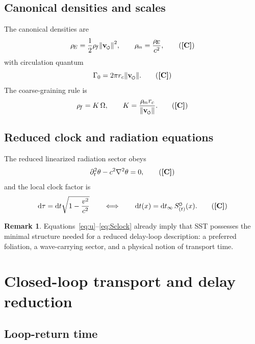 \documentclass[11pt]{article}
\newcommand{\swirlarrow}{\mathchoice{\mkern-2mu\scriptstyle\boldsymbol{\circlearrowleft}}{\mkern-2mu\scriptstyle\boldsymbol{\circlearrowleft}}{\mkern-2mu\scriptscriptstyle\boldsymbol{\circlearrowleft}}{\mkern-2mu\scriptscriptstyle\boldsymbol{\circlearrowleft}}}
\newcommand{\vswirl}{\mathbf{v}_{\swirlarrow}}
\newcommand{\SwirlClock}{S_{(t)}^{\swirlarrow}}
\newcommand{\rhoF}{\rho_{\!f}}\newcommand{\rhof}{\rho_{\!f}}     %
\newcommand{\rhoE}{\rho_{\!E}}\newcommand{\rhoe}{\rho_{\!E}}                           %
\newcommand{\rhoM}{\rho_{\!m}}\newcommand{\rhom}{\rho_{\!m}}                           %
\newcommand{\rc}{r_c}           %
\newcommand{\TagC}{\textbf{[C]}} %
\theoremstyle{definition}
\newtheorem{remark}[definition]{Remark}
\theoremstyle{plain}
\begin{document}
\subsection{Canonical densities and scales}

The canonical densities are
\begin{equation}
\rhoE=\frac12 \rhoF \norm{\vswirl}^2,
\qquad
\rhoM=\frac{\rhoE}{c^2},
\tag{\TagC}
\label{eq:rho}
\end{equation}
with circulation quantum
\begin{equation}
\Gamma_0=2\pi \rc \norm{\vswirl}.
\tag{\TagC}
\label{eq:Gamma0}
\end{equation}
The coarse-graining rule is
\begin{equation}
\rhoF = K\,\Omega,
\qquad
K=\frac{\rhoM \rc}{\norm{\vswirl}}.
\tag{\TagC}
\label{eq:K}
\end{equation}

\subsection{Reduced clock and radiation equations}

The reduced linearized radiation sector obeys
\begin{equation}
\partial_t^2\theta-c^2\nabla^2\theta=0,
\tag{\TagC}
\label{eq:theta}
\end{equation}
and the local clock factor is
\begin{equation}
\dd \tau = \dd t \sqrt{1-\frac{v^2}{c^2}}
\qquad\Longleftrightarrow\qquad
\dd t(x)=\dd t_\infty\,\SwirlClock(x).
\tag{\TagC}
\label{eq:Sclock}
\end{equation}

\begin{remark}
Equations~\eqref{eq:u}--\eqref{eq:Sclock} already imply that SST possesses the minimal structure needed for a reduced delay-loop description: a preferred foliation, a wave-carrying sector, and a physical notion of transport time.
\end{remark}

\section{Closed-loop transport and delay reduction}\label{sec:delay}

\subsection{Loop-return time}
\end{document}

